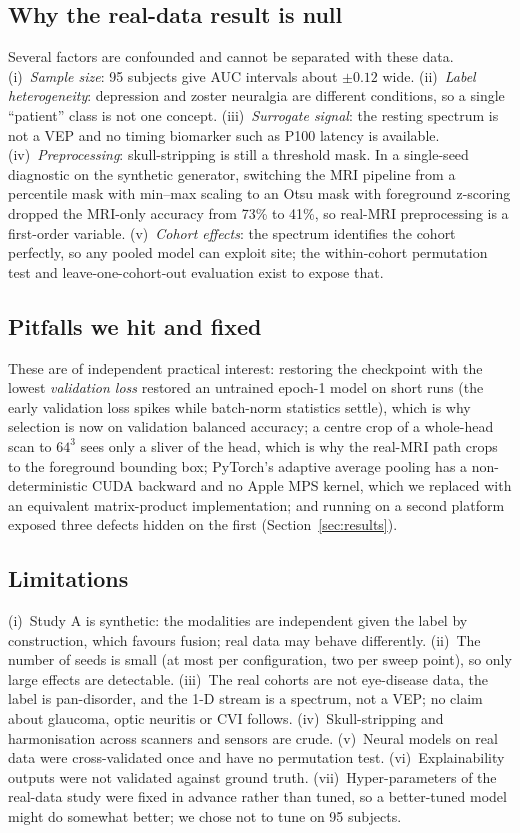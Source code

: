 \documentclass{ieeeaccessapprox}
\begin{document}
\subsection{Why the real-data result is null}
Several factors are confounded and cannot be separated with these data. (i)~\emph{Sample size}: 95 subjects give AUC intervals about $\pm0.12$ wide. (ii)~\emph{Label heterogeneity}: depression and zoster neuralgia are different conditions, so a single ``patient'' class is not one concept. (iii)~\emph{Surrogate signal}: the resting spectrum is not a VEP and no timing biomarker such as P100 latency is available. (iv)~\emph{Preprocessing}: skull-stripping is still a threshold mask. In a single-seed diagnostic on the synthetic generator, switching the MRI pipeline from a percentile mask with min--max scaling to an Otsu mask with foreground z-scoring dropped the MRI-only accuracy from 73\% to 41\%, so real-MRI preprocessing is a first-order variable. (v)~\emph{Cohort effects}: the spectrum identifies the cohort perfectly, so any pooled model can exploit site; the within-cohort permutation test and leave-one-cohort-out evaluation exist to expose that.

\subsection{Pitfalls we hit and fixed}
These are of independent practical interest: restoring the checkpoint with the lowest \emph{validation loss} restored an untrained epoch-1 model on short runs (the early validation loss spikes while batch-norm statistics settle), which is why selection is now on validation balanced accuracy; a centre crop of a whole-head scan to $64^3$ sees only a sliver of the head, which is why the real-MRI path crops to the foreground bounding box; PyTorch's adaptive average pooling has a non-deterministic CUDA backward and no Apple MPS kernel, which we replaced with an equivalent matrix-product implementation; and running on a second platform exposed three defects hidden on the first (Section~\ref{sec:results}).

\subsection{Limitations}
(i)~Study A is synthetic: the modalities are independent given the label by construction, which favours fusion; real data may behave differently. (ii)~The number of seeds is small (at most \nSeedsMax{} per configuration, two per sweep point), so only large effects are detectable. (iii)~The real cohorts are not eye-disease data, the label is pan-disorder, and the 1-D stream is a spectrum, not a VEP; no claim about glaucoma, optic neuritis or CVI follows. (iv)~Skull-stripping and harmonisation across scanners and sensors are crude. (v)~Neural models on real data were cross-validated once and have no permutation test. (vi)~Explainability outputs were not validated against ground truth. (vii)~Hyper-parameters of the real-data study were fixed in advance rather than tuned, so a better-tuned model might do somewhat better; we chose not to tune on 95 subjects.
\end{document}
